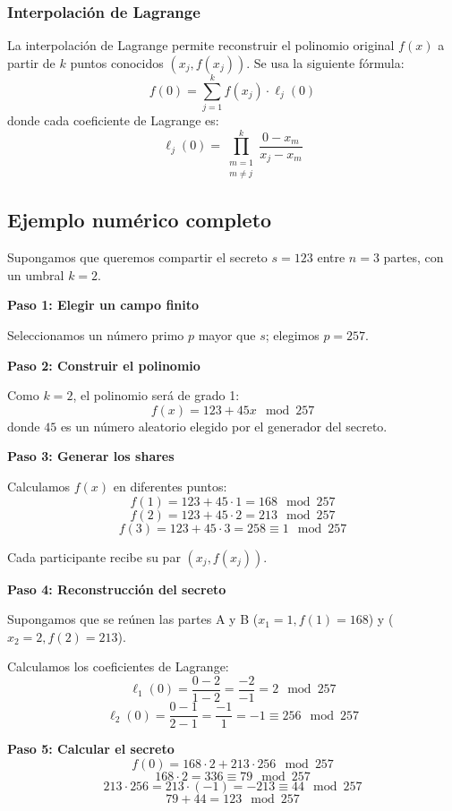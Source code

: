 \documentclass{article}
\begin{document}
\subsubsection{Interpolación de Lagrange}
La interpolación de Lagrange permite reconstruir el polinomio original \( f(x) \) a partir de \( k \) puntos conocidos \( (x_j, f(x_j)) \). Se usa la siguiente fórmula:
\[
f(0) = \sum_{j=1}^{k} f(x_j) \cdot \ell_j(0)
\]
donde cada coeficiente de Lagrange es:
\[
\ell_j(0) = \prod_{\substack{m=1 \\ m \neq j}}^{k} \frac{0 - x_m}{x_j - x_m}
\]

\subsection{Ejemplo numérico completo}

Supongamos que queremos compartir el secreto \( s = 123 \) entre \( n = 3 \) partes, con un umbral \( k = 2 \).

\textbf{Paso 1: Elegir un campo finito}

Seleccionamos un número primo \( p \) mayor que \( s \); elegimos \( p = 257 \).

\textbf{Paso 2: Construir el polinomio}

Como \( k = 2 \), el polinomio será de grado 1:
\[
f(x) = 123 + 45x \mod 257
\]
donde \( 45 \) es un número aleatorio elegido por el generador del secreto.

\textbf{Paso 3: Generar los shares}

Calculamos \( f(x) \) en diferentes puntos:
\[
f(1) = 123 + 45 \cdot 1 = 168 \mod 257
\]
\[
f(2) = 123 + 45 \cdot 2 = 213 \mod 257
\]
\[
f(3) = 123 + 45 \cdot 3 = 258 \equiv 1 \mod 257
\]

Cada participante recibe su par \( (x_j, f(x_j)) \).

\textbf{Paso 4: Reconstrucción del secreto}

Supongamos que se reúnen las partes A y B (\( x_1 = 1, f(1) = 168 \)) y (\( x_2 = 2, f(2) = 213 \)).

Calculamos los coeficientes de Lagrange:
\[
\ell_1(0) = \frac{0 - 2}{1 - 2} = \frac{-2}{-1} = 2 \mod 257
\]
\[
\ell_2(0) = \frac{0 - 1}{2 - 1} = \frac{-1}{1} = -1 \equiv 256 \mod 257
\]

\textbf{Paso 5: Calcular el secreto}
\[
f(0) = 168 \cdot 2 + 213 \cdot 256 \mod 257
\]
\[
168 \cdot 2 = 336 \equiv 79 \mod 257
\]
\[
213 \cdot 256 = 213 \cdot (-1) = -213 \equiv 44 \mod 257
\]
\[
79 + 44 = 123 \mod 257
\]
\end{document}
